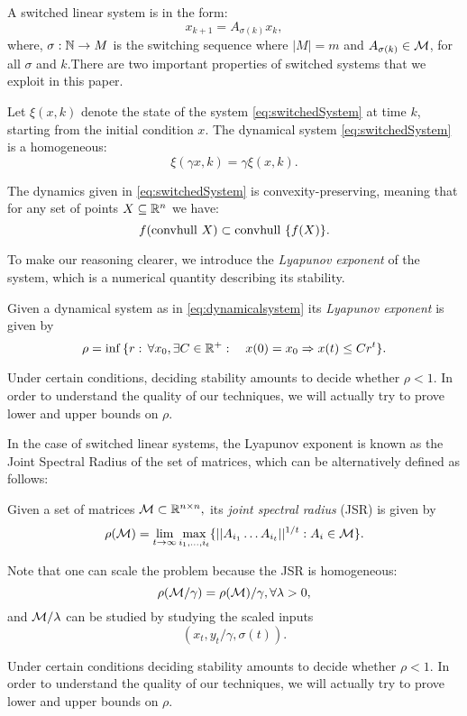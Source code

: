 A switched linear system is in the form:
\begin{equation}\label{eq:switchedSystem}x_{k+1} = A_{\sigma(k)}x_k,\end{equation}
where, $\sigma: \mathbb{N} \to M$ is the switching sequence where $|M| = m$ and $A_{\sigma(k)} \in \mathcal{M}$, for all $\sigma$ and $k$.There are two important properties of switched systems that we exploit in this paper.
\begin{property}\label{property:homogeneity}
Let $\xi(x, k)$ denote the state of the system \eqref{eq:switchedSystem} at time $k$, starting from the initial condition $x$. The dynamical system \eqref{eq:switchedSystem} is a homogeneous:
$$\xi(\gamma x, k)= \gamma \xi(x, k). $$
\end{property}
\begin{property}\label{property:convpres}
The dynamics given in \eqref{eq:switchedSystem} is convexity-preserving, meaning that for any set of points $X \subseteq \mathbb{R}^n$ we have:
$$ f(\mbox{convhull }{X})\subset \mbox{convhull }\{f(X)\}. $$
\end{property}

To make our reasoning clearer, we introduce the \emph{Lyapunov exponent} of the system, which is a numerical quantity describing its stability.
\begin{definition}   Given a dynamical system as in \eqref{eq:dynamicalsystem} its \emph{Lyapunov exponent} is given by
$$\rho =\inf{\{r:\,\forall x_0, \exists C\in \mathbb{R}^+: \quad x(0)=x_0 \Rightarrow x(t)\leq Cr^t\}}. $$
\end{definition}
Under certain conditions, deciding stability amounts to decide whether $\rho<1.$  In order to understand the quality of our techniques, we will actually try to prove lower and upper bounds on $\rho.$ 

In the case of switched linear systems, the Lyapunov exponent is known as the Joint Spectral Radius of the set of matrices, which can be alternatively defined as follows:
\begin{definition} \cite{jungers_lncis} Given a set of matrices $\mathcal{M} \subset \mathbb{R}^{n\times n},$ its \emph{joint spectral radius} (JSR) is given by
$$\rho(\mathcal{M}) =\lim_{t\rightarrow \infty} \max_{i_1,\dots, i_t}\{||A_{i_1} \dots A_{i_t}||^{1/t}: A_i\in\mathcal{M}\}. $$
\end{definition}

\begin{remark}\label{rem:scaling}
 Note that one can scale the problem because the JSR is homogeneous:
$$\rho(\mathcal{M}/\gamma)=\rho(\mathcal{M})/\gamma, \forall \lambda>0, $$ and $\mathcal{M}/\lambda$ can be studied by studying the scaled inputs $$(x_t, y_t/\gamma,\sigma(t)).$$
\end{remark}

Under certain conditions deciding stability amounts to decide whether $\rho<1.$  In order to understand the quality of our techniques, we will actually try to prove lower and upper bounds on $\rho.$ 
